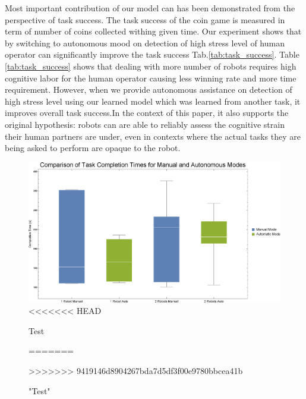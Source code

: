 \documentclass{sig-alternate}
\begin{document}
Most important contribution of our model can has been demonstrated from the perspective of task success. The task success of the coin game is measured in term of number of coins collected withing given time. Our experiment shows that by switching to autonomous mood on detection of high stress level of human operator can significantly improve the task success Tab.\ref{tab:task_success}. Table \ref{tab:task_success} shows that dealing with more number of robots requires high cognitive labor for the human operator causing less winning rate and more time requirement. However, when we provide autonomous assistance on detection of high stress level using our learned model which was learned from another task, it improves overall task success.In the context of this paper, it also supports the original hypothesis: robots can are able to reliably assess the cognitive strain their human partners are under, even in contexts where the actual tasks they are being asked to perform are opaque to the robot.

\begin{figure}
\centering
\includegraphics[width=.5\textwidth]{BoxWiskerTimesCompMaualVsAuto.eps}
<<<<<<< HEAD
\caption{Test}
=======
\caption{"Test"}
>>>>>>> 9419146d8904267bda7d5df3f00e9780bbcea41b
\label{fig:BoxWiskersTimeComp}
\end{figure}
\end{document}
